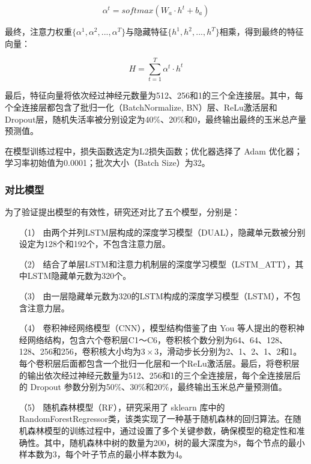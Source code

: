 \begin{equation}
  \label{equ:attention_alpha}
  \alpha ^t=softmax (W_a\cdot h^t+b_a)
\end{equation}

\par 最终，注意力权重$\{\alpha ^1,\alpha ^2,..., \alpha ^T \}$与隐藏特征$\{h ^1,h ^2,..., h ^T \}$相乘，得到最终的特征向量：

\begin{equation}
  \label{equ:attention}
  H=\sum_{t=1}^T \alpha ^t\cdot h^t
\end{equation}

\par 最后，特征向量将依次经过神经元数量为512、256和1的三个全连接层。其中，每个全连接层都包含了批归一化（BatchNormalize, BN）层、ReLu激活层和Dropout层，随机失活率被分别设定为40\%、20\%和0，最终输出最终的玉米总产量预测值。

\par 在模型训练过程中，损失函数选定为L2损失函数；优化器选择了 Adam 优化器；学习率初始值为0.0001；批次大小（Batch Size）为32。

\subsubsection{对比模型}

\par 为了验证提出模型的有效性，研究还对比了五个模型，分别是：

\begin{itemize}
  \item [（1）] 由两个并列LSTM层构成的深度学习模型（DUAL），隐藏单元数被分别设定为128个和192个，不包含注意力层。
  \item [（2）] 结合了单层LSTM和注意力机制层的深度学习模型（LSTM\_ATT），其中LSTM隐藏单元数为320个。
  \item [（3）] 由一层隐藏单元数为320的LSTM构成的深度学习模型（LSTM），不包含注意力层。
  \item [（4）] 卷积神经网络模型（CNN），模型结构借鉴了由 You 等人\cite{you2017deep}提出的卷积神经网络结构，包含六个卷积层C1～C6，卷积核个数分别为64、64、128、128、256和256，卷积核大小均为$3\times 3$，滑动步长分别为2、1、2、1、2和1。每个卷积层后面都包含一个批归一化层和一个ReLu激活层。最后，将卷积层的输出依次经过神经元数量为512、256和1的三个全连接层，每个全连接层后的 Dropout 参数分别为50\%、30\%和20\%，最终输出玉米总产量预测值。
  \item [（5）] 随机森林模型（RF），研究采用了 sklearn 库中的RandomForestRegressor类，该类实现了一种基于随机森林的回归算法。在随机森林模型的训练过程中，通过设置了多个关键参数，确保模型的稳定性和准确性。其中，随机森林中树的数量为200，树的最大深度为8，每个节点的最小样本数为3，每个叶子节点的最小样本数为4。
\end{itemize}

